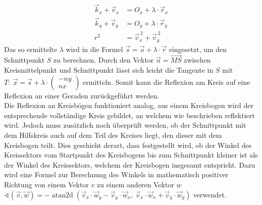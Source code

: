 \documentclass[reducespace,stylepage,semiarbeit]{spezidoc}
\DeclareMathOperator{\atantwo}{atan2d}
\begin{document}
\begin{equation*}
\begin{split}
\vec{k}_x + \vec{v}_x & = O_x + \lambda\cdot\vec{r}_x\\
\vec{k}_y + \vec{v}_y & = O_y + \lambda\cdot\vec{r}_y\\
r^2 & = \vec{v}_x^{~2} + \vec{v}_y^{~2} 
\end{split}
\end{equation*}
Das so ermittelte $\lambda$ wird in die Formel $\vec{s} = \vec{o} + \lambda \cdot \vec{r}$  eingesetzt, um den Schnittpunkt $S$ zu berechnen. 
Durch den Vektor $\vec{n} = \vec{MS}$ zwischen Kreismittelpunkt und Schnittpunkt lässt sich leicht die Tangente in $S$ mit $T: ~\vec{x} = \vec{s} + \lambda \cdot \begin{pmatrix} -ny \\ nx \end{pmatrix}$ ermitteln.
Somit kann die Reflexion am Kreis auf eine Reflexion an einer Geraden zurückgeführt werden.\\
Die Reflexion an Kreisbögen funktioniert analog, aus einem Kreisbogen wird der entsprechende vollständige Kreis gebildet, an welchem wie beschrieben reflektiert wird. 
Jedoch muss zusätzlich noch überprüft werden, ob der Schnittpunkt mit dem \glqq Hilfskreis\grqq{} auch auf dem Teil des Kreises liegt, den dieser mit dem Kreisbogen teilt. 
Dies geschieht derart, dass festgestellt wird, ob der Winkel des Kreissektors vom Startpunkt des Kreisbogens bis zum Schnittpunkt kleiner ist als der Winkel des Kreissektors, welchem der Kreisbogen insgesamt entspricht. 
Dazu wird eine Formel zur Berechnung des Winkels in mathematisch positiver Richtung von einem Vektor $v$ zu einem anderen Vektor $w$ $\sphericalangle(\vec{v}, \vec{w}) = -\atantwo(\vec{v}_x\cdot\vec{w}_y-\vec{v}_y\cdot\vec{w}_x,~\vec{v}_x\cdot\vec{w}_x+\vec{v}_y\cdot\vec{w}_y)$  verwendet.
\par
\end{document}
